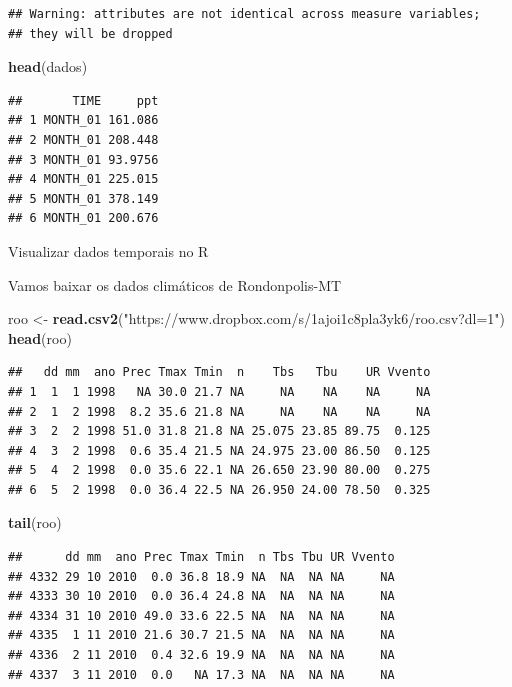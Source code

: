 \documentclass[
]{book}
\newenvironment{Shaded}{\begin{snugshade}}{\end{snugshade}}
\newcommand{\KeywordTok}[1]{\textcolor[rgb]{0.13,0.29,0.53}{\textbf{#1}}}
\newcommand{\NormalTok}[1]{#1}
\newcommand{\StringTok}[1]{\textcolor[rgb]{0.31,0.60,0.02}{#1}}
\begin{document}
\begin{verbatim}
## Warning: attributes are not identical across measure variables;
## they will be dropped
\end{verbatim}

\begin{Shaded}
\begin{Highlighting}[]
\KeywordTok{head}\NormalTok{(dados)}
\end{Highlighting}
\end{Shaded}

\begin{verbatim}
##       TIME     ppt
## 1 MONTH_01 161.086
## 2 MONTH_01 208.448
## 3 MONTH_01 93.9756
## 4 MONTH_01 225.015
## 5 MONTH_01 378.149
## 6 MONTH_01 200.676
\end{verbatim}

Visualizar dados temporais no R

Vamos baixar os dados climáticos de Rondonpolis-MT

\begin{Shaded}
\begin{Highlighting}[]
\NormalTok{roo <-}\StringTok{ }\KeywordTok{read.csv2}\NormalTok{(}\StringTok{"https://www.dropbox.com/s/1ajoi1c8pla3yk6/roo.csv?dl=1"}\NormalTok{)}
\KeywordTok{head}\NormalTok{(roo)}
\end{Highlighting}
\end{Shaded}

\begin{verbatim}
##   dd mm  ano Prec Tmax Tmin  n    Tbs   Tbu    UR Vvento
## 1  1  1 1998   NA 30.0 21.7 NA     NA    NA    NA     NA
## 2  1  2 1998  8.2 35.6 21.8 NA     NA    NA    NA     NA
## 3  2  2 1998 51.0 31.8 21.8 NA 25.075 23.85 89.75  0.125
## 4  3  2 1998  0.6 35.4 21.5 NA 24.975 23.00 86.50  0.125
## 5  4  2 1998  0.0 35.6 22.1 NA 26.650 23.90 80.00  0.275
## 6  5  2 1998  0.0 36.4 22.5 NA 26.950 24.00 78.50  0.325
\end{verbatim}

\begin{Shaded}
\begin{Highlighting}[]
\KeywordTok{tail}\NormalTok{(roo)}
\end{Highlighting}
\end{Shaded}

\begin{verbatim}
##      dd mm  ano Prec Tmax Tmin  n Tbs Tbu UR Vvento
## 4332 29 10 2010  0.0 36.8 18.9 NA  NA  NA NA     NA
## 4333 30 10 2010  0.0 36.4 24.8 NA  NA  NA NA     NA
## 4334 31 10 2010 49.0 33.6 22.5 NA  NA  NA NA     NA
## 4335  1 11 2010 21.6 30.7 21.5 NA  NA  NA NA     NA
## 4336  2 11 2010  0.4 32.6 19.9 NA  NA  NA NA     NA
## 4337  3 11 2010  0.0   NA 17.3 NA  NA  NA NA     NA
\end{verbatim}
\end{document}
